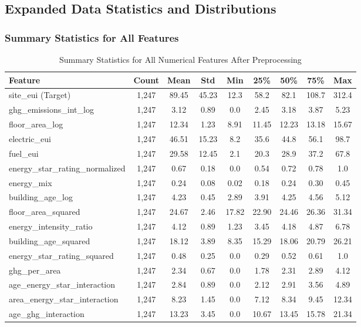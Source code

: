 \subsection{Expanded Data Statistics and Distributions}

\subsubsection{Summary Statistics for All Features}

\begin{table}[h]
\centering
\caption{Summary Statistics for All Numerical Features After Preprocessing}
\begin{tabular}{|l|c|c|c|c|c|c|c|c|}
\hline
\textbf{Feature} & \textbf{Count} & \textbf{Mean} & \textbf{Std} & \textbf{Min} & \textbf{25\%} & \textbf{50\%} & \textbf{75\%} & \textbf{Max} \\
\hline
site\_eui (Target) & 1,247 & 89.45 & 45.23 & 12.3 & 58.2 & 82.1 & 108.7 & 312.4 \\
\hline
ghg\_emissions\_int\_log & 1,247 & 3.12 & 0.89 & 0.0 & 2.45 & 3.18 & 3.87 & 5.23 \\
\hline
floor\_area\_log & 1,247 & 12.34 & 1.23 & 8.91 & 11.45 & 12.23 & 13.18 & 15.67 \\
\hline
electric\_eui & 1,247 & 46.51 & 15.23 & 8.2 & 35.6 & 44.8 & 56.1 & 98.7 \\
\hline
fuel\_eui & 1,247 & 29.58 & 12.45 & 2.1 & 20.3 & 28.9 & 37.2 & 67.8 \\
\hline
energy\_star\_rating\_normalized & 1,247 & 0.67 & 0.18 & 0.0 & 0.54 & 0.72 & 0.78 & 1.0 \\
\hline
energy\_mix & 1,247 & 0.24 & 0.08 & 0.02 & 0.18 & 0.24 & 0.30 & 0.45 \\
\hline
building\_age\_log & 1,247 & 4.23 & 0.45 & 2.89 & 3.91 & 4.25 & 4.56 & 5.12 \\
\hline
floor\_area\_squared & 1,247 & 24.67 & 2.46 & 17.82 & 22.90 & 24.46 & 26.36 & 31.34 \\
\hline
energy\_intensity\_ratio & 1,247 & 4.12 & 0.89 & 1.23 & 3.45 & 4.18 & 4.87 & 6.78 \\
\hline
building\_age\_squared & 1,247 & 18.12 & 3.89 & 8.35 & 15.29 & 18.06 & 20.79 & 26.21 \\
\hline
energy\_star\_rating\_squared & 1,247 & 0.48 & 0.25 & 0.0 & 0.29 & 0.52 & 0.61 & 1.0 \\
\hline
ghg\_per\_area & 1,247 & 2.34 & 0.67 & 0.0 & 1.78 & 2.31 & 2.89 & 4.12 \\
\hline
age\_energy\_star\_interaction & 1,247 & 2.84 & 0.89 & 0.0 & 2.12 & 2.91 & 3.56 & 4.89 \\
\hline
area\_energy\_star\_interaction & 1,247 & 8.23 & 1.45 & 0.0 & 7.12 & 8.34 & 9.45 & 12.34 \\
\hline
age\_ghg\_interaction & 1,247 & 13.23 & 3.45 & 0.0 & 10.67 & 13.45 & 15.78 & 21.34 \\
\hline
\end{tabular}
\end{table}

